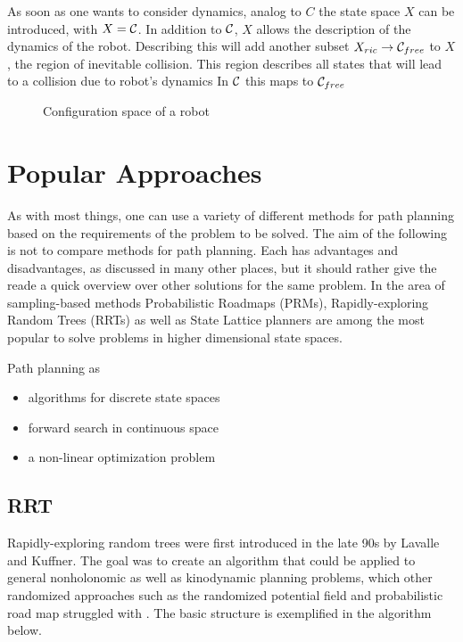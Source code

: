 As soon as one wants to consider dynamics, analog to $C$ the state space $X$ can be introduced, with $X = \mathcal{C}$. In addition to $\mathcal{C}$, $X$ allows the description of the dynamics of the robot. Describing this will add another subset $X_{ric} \to \mathcal{C}_{free}$ to $X$, the region of inevitable collision. This region describes all states that will lead to a collision due to robot's dynamics In $\mathcal{C}$ this maps to $\mathcal{C}_{free}$

\begin{figure}[h]
    \caption{Configuration space of a robot}
    \label{fig:configurationSpace}
\end{figure}

\section{Popular Approaches}
As with most things, one can use a variety of different methods for path planning based on the requirements of the problem to be solved. The aim of the following is not to compare methods for path planning. Each has advantages and disadvantages, as discussed in many other places, but it should rather give the reade a quick overview over other solutions for the same problem. In the area of sampling-based methods Probabilistic Roadmaps (PRMs), Rapidly-exploring Random Trees (RRTs) as well as State Lattice planners are among the most popular to solve problems in higher dimensional state spaces.

Path planning as 

\begin{itemize}
    \item algorithms for discrete state spaces
    \item forward search in continuous space
    \item a non-linear optimization problem
\end{itemize}

\subsection{RRT}
Rapidly-exploring random trees were first introduced in the late 90s by Lavalle and Kuffner. The goal was to create an algorithm that could be applied to general nonholonomic as well as kinodynamic planning problems, which other randomized approaches such as the randomized potential field and probabilistic road map struggled with \cite{Lavalle.1998}. The basic structure is exemplified in the algorithm below.

